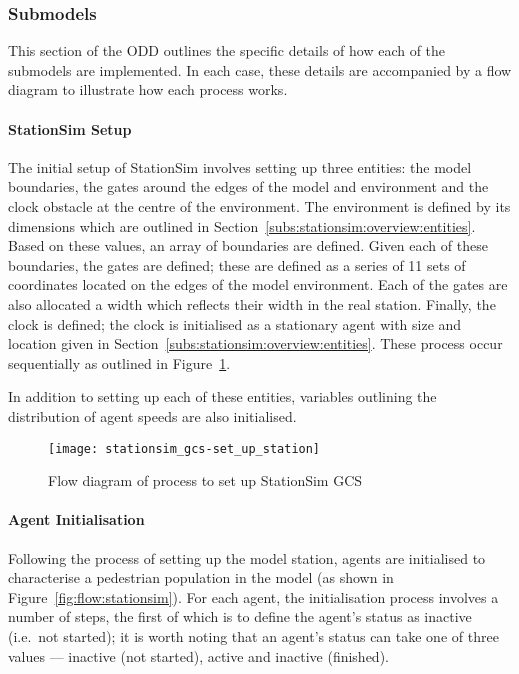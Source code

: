\subsubsection{Submodels}\label{subs:stationsim:details:submodels}

This section of the ODD outlines the specific details of how each of the
submodels are implemented.
In each case, these details are accompanied by a flow diagram to illustrate how
each process works.

\paragraph{StationSim Setup}\label{para:submodels:setup}

The initial setup of StationSim involves setting up three entities: the model
boundaries, the gates around the edges of the model and environment and the
clock obstacle at the centre of the environment.
The environment is defined by its dimensions which are outlined in
Section~\ref{subs:stationsim:overview:entities}.
Based on these values, an array of boundaries are defined.
Given each of these boundaries, the gates are defined; these are defined as a
series of 11 sets of coordinates located on the edges of the model environment.
Each of the gates are also allocated a width which reflects their width in the
real station.
Finally, the clock is defined; the clock is initialised as a stationary agent
with size and location given in Section~\ref{subs:stationsim:overview:entities}.
These process occur sequentially as outlined in
Figure~\ref{fig:flow:set_up_station}.

In addition to setting up each of these entities, variables outlining the
distribution of agent speeds are also initialised.

\begin{figure}[h]
    \centering
    \texttt{[image: stationsim\_gcs-set\_up\_station]}
    \caption{Flow diagram of process to set up StationSim
    GCS}\label{fig:flow:set_up_station}
\end{figure}

\paragraph{Agent Initialisation}\label{para:submodels:agent_init}

Following the process of setting up the model station, agents are initialised to
characterise a pedestrian population in the model (as shown in
Figure~\ref{fig:flow:stationsim}).
For each agent, the initialisation process involves a number of steps, the first
of which is to define the agent's status as inactive (i.e.\ not started); it is
worth noting that an agent's status can take one of three values --- inactive
(not started), active and inactive (finished).

